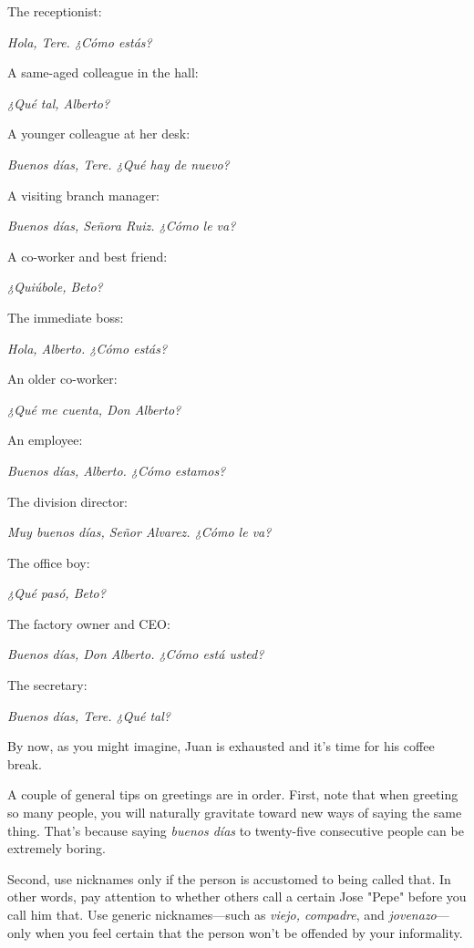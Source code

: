 \documentclass[14pt,a4paper,oneside]{memoir}
\newcommand{\bsk}{\vspace{20pt}}
\newcommand{\inda}{\hspace{40pt}}
\newcommand{\indu}{\hspace{20pt}}
\begin{document}
\inda The receptionist:

\indu \emph{Hola, Tere. ¿Cómo estás?}

\inda A same-aged colleague in the hall:

\indu \emph{¿Qué tal, Alberto?}

\inda A younger colleague at her desk:

\indu \emph{Buenos días, Tere. ¿Qué hay de nuevo?}

\inda A visiting branch manager:

\indu \emph{Buenos días, Señora Ruiz. ¿Cómo le va?}

\inda A co-worker and best friend:

\indu \emph{¿Quiúbole, Beto?}

\inda The immediate boss:

\indu \emph{Hola, Alberto. ¿Cómo estás?}

\inda An older co-worker:

\indu \emph{¿Qué me cuenta, Don Alberto?}

\inda An employee:

\indu \emph{Buenos días, Alberto. ¿Cómo estamos?}

\inda The division director:

\indu \emph{Muy buenos días, Señor Alvarez. ¿Cómo le va?}

\inda The office boy:

\indu \emph{¿Qué pasó, Beto?}

\inda The factory owner and CEO:

\indu \emph{Buenos días, Don Alberto. ¿Cómo está usted?}

\inda The secretary:

\indu \emph{Buenos días, Tere. ¿Qué tal?}

\bsk

By now, as you might imagine, Juan is exhausted and it's time for his
coffee break.

A couple of general tips on greetings are in order. First, note
that when greeting so many people, you will naturally gravitate toward
new ways of saying the same thing. That's because saying \emph{buenos días}
to twenty-five consecutive people can be extremely boring.

Second, use nicknames only if the person is accustomed to being called that. In other words, pay attention to whether others call a
certain Jose "Pepe" before you call him that. Use generic nicknames---such as \emph{viejo, compadre}, and \emph{jovenazo}---only when you feel certain
that the person won't be offended by your informality.
\end{document}
